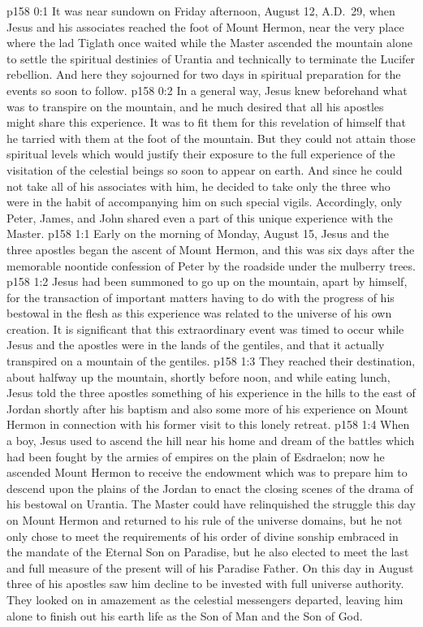 \author{Midwayer Commission}
\vs p158 0:1 It was near sundown on Friday afternoon, August 12, A.D.~29, when Jesus and his associates reached the foot of Mount Hermon, near the very place where the lad Tiglath once waited while the Master ascended the mountain alone to settle the spiritual destinies of Urantia and technically to terminate the Lucifer rebellion. And here they sojourned for two days in spiritual preparation for the events so soon to follow.
\vs p158 0:2 In a general way, Jesus knew beforehand what was to transpire on the mountain, and he much desired that all his apostles might share this experience. It was to fit them for this revelation of himself that he tarried with them at the foot of the mountain. But they could not attain those spiritual levels which would justify their exposure to the full experience of the visitation of the celestial beings so soon to appear on earth. And since he could not take all of his associates with him, he decided to take only the three who were in the habit of accompanying him on such special vigils. Accordingly, only Peter, James, and John shared even a part of this unique experience with the Master.
\vs p158 1:1 Early on the morning of Monday, August 15, Jesus and the three apostles began the ascent of Mount Hermon, and this was six days after the memorable noontide confession of Peter by the roadside under the mulberry trees.
\vs p158 1:2 Jesus had been summoned to go up on the mountain, apart by himself, for the transaction of important matters having to do with the progress of his bestowal in the flesh as this experience was related to the universe of his own creation. It is significant that this extraordinary event was timed to occur while Jesus and the apostles were in the lands of the gentiles, and that it actually transpired on a mountain of the gentiles.
\vs p158 1:3 They reached their destination, about halfway up the mountain, shortly before noon, and while eating lunch, Jesus told the three apostles something of his experience in the hills to the east of Jordan shortly after his baptism and also some more of his experience on Mount Hermon in connection with his former visit to this lonely retreat.
\vs p158 1:4 When a boy, Jesus used to ascend the hill near his home and dream of the battles which had been fought by the armies of empires on the plain of Esdraelon; now he ascended Mount Hermon to receive the endowment which was to prepare him to descend upon the plains of the Jordan to enact the closing scenes of the drama of his bestowal on Urantia. The Master could have relinquished the struggle this day on Mount Hermon and returned to his rule of the universe domains, but he not only chose to meet the requirements of his order of divine sonship embraced in the mandate of the Eternal Son on Paradise, but he also elected to meet the last and full measure of the present will of his Paradise Father. On this day in August three of his apostles saw him decline to be invested with full universe authority. They looked on in amazement as the celestial messengers departed, leaving him alone to finish out his earth life as the Son of Man and the Son of God.
